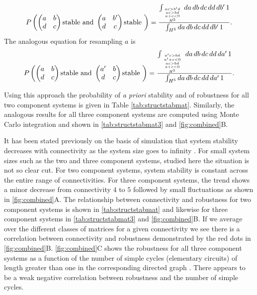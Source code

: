\begin{align*}
P\left(\begin{pmatrix}
a & b \\
d & c
\end{pmatrix} \textrm{stable and } \begin{pmatrix}
a & b' \\
d & c
\end{pmatrix} \textrm{stable } \right) = \frac{\int_{{{ac>b'd \atop ac>bd} \atop a+c<0} \atop H^5} da\,db\,dc\,dd\,db'\,1}{\int_{H^5} da\,db\,dc\,dd\,db'\,1}.
\end{align*}
The analogous equation for resampling $a$ is
\begin{align*}
P\left(\begin{pmatrix}
a & b \\
d & c
\end{pmatrix} \textrm{stable and } \begin{pmatrix}
a' & b \\
d & c
\end{pmatrix} \textrm{stable } \right) = \frac{\int_{{{{a'c>bd \atop a' + c < 0} \atop ac>bd} \atop a+c<0} \atop H^5} da\,db\,dc\,dd\,da'\,1}{\int_{H^5} da\,db\,dc\,dd\,da'\,1}.
\end{align*}

Using this approach the probability of \emph{a priori} stability and of robustness for all two component systems is given in Table \ref{tab:structstabmat}. Similarly, the analogous results for all three component systems are computed using Monte Carlo integration and shown in \ref{tab:structstabmat3} and \ref{fig:combined}B.


It has been stated previously on the basis of simulation that system stability decreases with connectivity as the system size goes to infinity \cite{May1972}. For small system sizes such as the two and three component systems, studied here the situation is not so clear cut. For two component systems, system stability is constant across the entire range of connectivities. For three component systems, the trend shows a minor decrease from connectivity $4$ to $5$ followed by small fluctuations as shown in \ref{fig:combined}A.
The relationship between connectivity and robustness for two component systems is shown in \ref{tab:structstabmat} and likewise for three component systems in \ref{tab:structstabmat3} and \ref{fig:combined}B. If we average over the different classes of matrices for a given connectivity we see there is a correlation between connectivity and robustness demonstrated by the red dots in \ref{fig:combined}B.
\ref{fig:combined}C shows the robustness for all three component systems as a function of the number of simple cycles (elementary circuits) of length greater than one in the corresponding directed graph \cite{Johnson1975}. There appears to be a weak negative correlation between robustness and the number of simple cycles.

